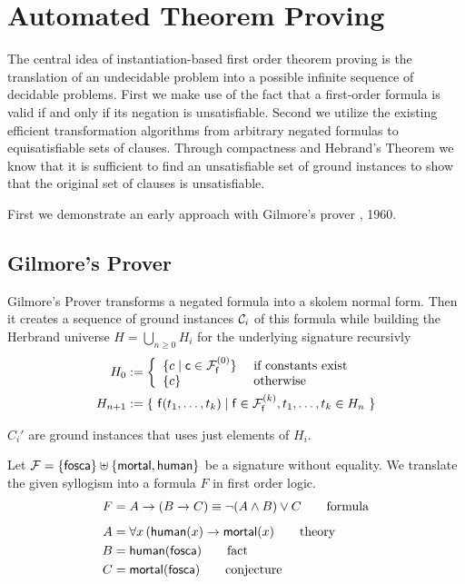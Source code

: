
\chapter{Automated Theorem Proving}



The central idea of instantiation-based first order theorem proving is the
translation of an undecidable problem into a possible infinite sequence of decidable problems.
First we make use of the fact that a first-order formula is valid if and only if its negation is unsatisfiable.
Second we utilize the existing efficient transformation algorithms from arbitrary negated formulas to equisatisfiable sets of clauses.
Through compactness and Hebrand's Theorem we know that it is sufficient to find an unsatisfiable set of ground instances 
to show that the original set of clauses is unsatisfiable. 


First we demonstrate an early approach with Gilmore's prover \cite{5392528}, 1960. 

\section{Gilmore's Prover}

Gilmore's Prover transforms a negated formula into a skolem normal form.
Then it creates a sequence of ground instances ${\mathcal C}_i$ of this formula while building the Herbrand universe 
$H = \bigcup_{n\geq 0} H_i$ for the underlying signature
recursivly
\begin{align*}
H_0 &:= \left\{ 
	\begin{array}{ll}
	\{ c \mid \mc\in\mcFfn[0] \} 
	&\text{if constants exist}\\
	\{ c \}
	&\text{otherwise}
	\end{array}
\right. 
\\
H_{n+1} &:= \{\  
	\mf(t_1,\ldots,t_k) \mid
	\mf\in\mcFfn[k],
	t_1,\ldots,t_k \in H_n
\ \}
\end{align*}

$C_i'$ are ground instances that uses just elements of $H_i$. 





\begin{example}
	Let ${\mathcal F} = \{ \mathsf{fosca} \} \uplus \{ \mathsf{mortal}, \mathsf{human} \}$ be a signature without equality. 
	We translate the given syllogism into a formula $F$ in first order logic.
	\begin{align*}
		F &= A \rightarrow (B \rightarrow C) \equiv \lnot(A\land B) \lor C 
		\tag*{formula}
		\\[0.5em]
		A &= \forall x\, ( \mathsf{human}(x) \rightarrow \mathsf{mortal}(x) 
		\tag*{theory}
		\\
		B &= \mathsf{human}(\mathsf{fosca}) 
		\tag*{fact}
		\\
		C &= \mathsf{mortal}(\mathsf{fosca})
		\tag*{conjecture}
	\end{align*}
\end{example}
 
